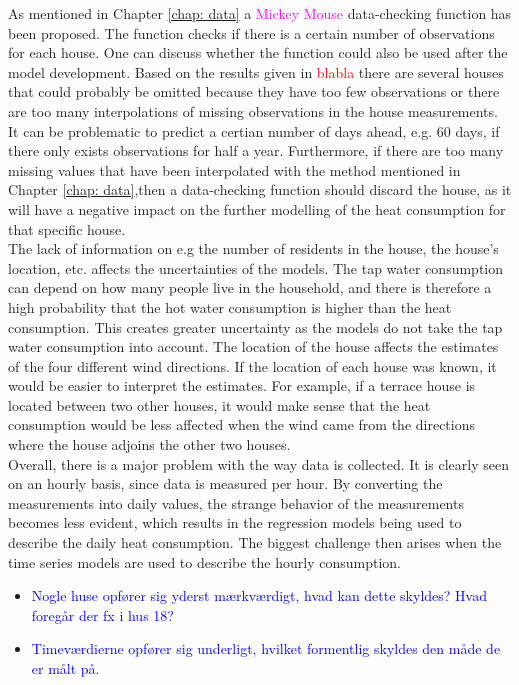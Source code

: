 \noindent As mentioned in Chapter \ref{chap: data} a \textcolor{magenta}{Mickey Mouse} data-checking function has been proposed. The function checks if there is a certain number of observations for each house. One can discuss whether the function could also be used after the model development. Based on the results given in \textcolor{red}{blabla} there are several houses that could probably be omitted because they have too few observations or there are too many interpolations of missing observations in the house measurements. It can be problematic to predict a certian number of days ahead, e.g. 60 days, if there only exists observations for half a year. Furthermore, if there are too many missing values ​​that have been interpolated with the method mentioned in Chapter \ref{chap: data},then a data-checking function should discard the house, as it will have a negative impact on the further modelling of the heat consumption for that specific house. \\

\noindent The lack of information on e.g the number of residents in the house, the house's location, etc. affects the uncertainties of the models. The tap water consumption can depend on how many people live in the household, and there is therefore a high probability that the hot water consumption is higher than the heat consumption. This creates greater uncertainty as the models do not take the tap water consumption into account. The location of the house affects the estimates of the four different wind directions. If the location of each house was known, it would be easier to interpret the estimates. For example, if a terrace house is located between two other houses, it would make sense that the heat consumption would be less affected when the wind came from the directions where the house adjoins the other two houses. \\

\noindent Overall, there is a major problem with the way data is collected. It is clearly seen on an hourly basis, since data is measured per hour. By converting the measurements into daily values, the strange behavior of the measurements becomes less evident, which results in the regression models being used to describe the daily heat consumption. The biggest challenge then arises when the time series models are used to describe the hourly consumption.


\begin{itemize}
    \item \textcolor{blue}{Nogle huse opfører sig yderst mærkværdigt, hvad kan dette skyldes? Hvad foregår der fx i hus 18?}
    \item \textcolor{blue}{Timeværdierne opfører sig underligt, hvilket formentlig skyldes den måde de er målt på.} 
\end{itemize}

